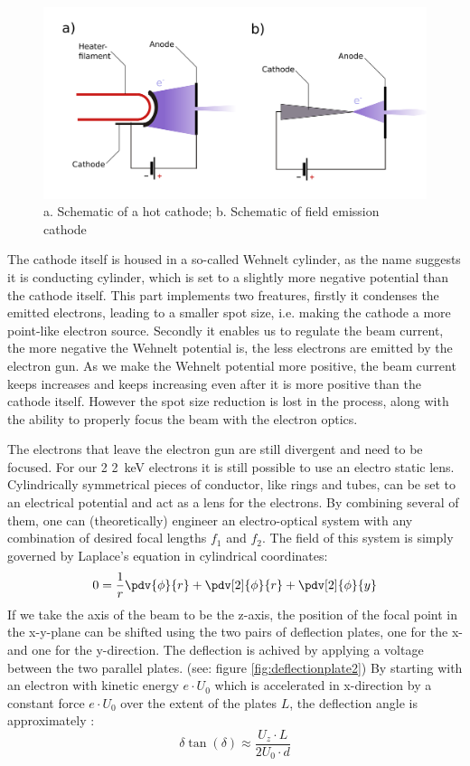 \begin{figure}
	\centering
	\includegraphics[width=0.9\linewidth]{Chapters/CRT-Basics/HotCathodeColdCathode}
	\caption{a. Schematic of a hot cathode; b. Schematic of field emission cathode}
	\label{fig:hotcathodecoldcathode}
\end{figure}

The cathode itself is housed in a so-called Wehnelt cylinder, as the name suggests it is conducting cylinder, which is set to a slightly more negative potential than the cathode itself. This part implements two freatures, firstly it condenses the emitted electrons, leading to a smaller spot size, i.e. making the cathode a more point-like electron source. Secondly it enables us to regulate the beam current, the more negative the Wehnelt potential is, the less electrons are emitted by the electron gun. As we make the Wehnelt potential more positive, the beam current keeps increases and keeps increasing even after it is more positive than the cathode itself. However the spot size reduction is lost in the process, along with the ability to properly focus the beam with the electron optics.

The electrons that leave the electron gun are still divergent and need to be focused. For our 2 \SI{2}{\kilo\electronvolt} electrons it is still possible to use an electro static lens. Cylindrically symmetrical pieces of conductor, like rings and tubes, can be set to an electrical potential and act as a lens for the electrons. By combining several of them, one can (theoretically) engineer an electro-optical system with any combination of desired focal lengths $f_1$ and $f_2$. The field of this system is simply governed by Laplace's equation in cylindrical coordinates:
\begin{equation}
	0=\dfrac{1}{r}\pdv{\phi}{r}+\pdv[2]{\phi}{r}+\pdv[2]{\phi}{y}
\end{equation}
If we take the axis of the beam to be the z-axis, the position of the focal point in the x-y-plane can be shifted using the two pairs of deflection plates, one for the x- and one for the y-direction. The deflection is achived by applying a voltage between the two parallel plates. (see: figure \ref{fig:deflectionplate2}) By starting with an electron with kinetic energy $e \cdot U_0$ which is accelerated in x-direction by a constant force $e\cdot U_0$ over the extent of the plates $L$, the deflection angle is approximately \cite{Demtroeder3}:
\begin{equation}\label{key}
\delta \tan(\delta) \approx \frac{U_z\cdot L}{2 U_0 \cdot d}
\end{equation}

